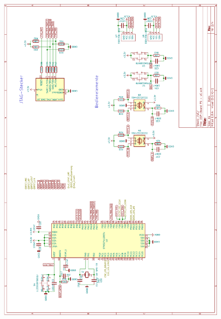 \begin{appendix}
\begin{figure}[h]
	\centering
	\includegraphics[width=0.95\linewidth]{appendix/DSP-Board-Schema-V1-1(2).pdf}
\end{figure}


\end{appendix}
